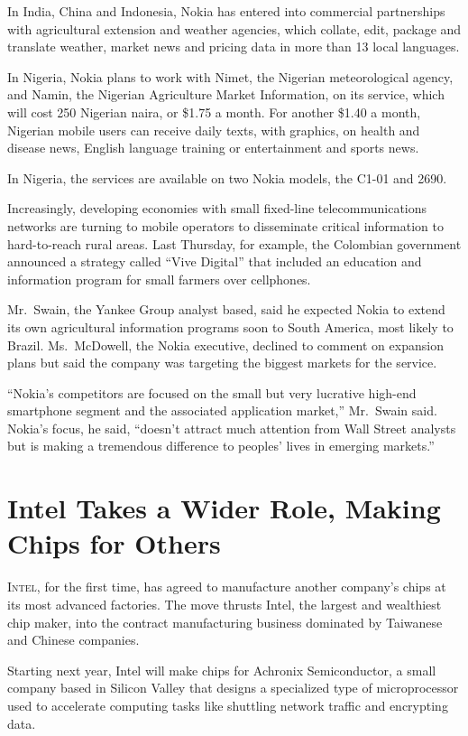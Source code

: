 ﻿\documentclass[12pt]{article}
\begin{document}
In India, China and Indonesia, Nokia has entered into commercial partnerships with agricultural
extension and weather agencies, which collate, edit, package and translate weather, market news and
pricing data in more than 13 local languages.

In Nigeria, Nokia plans to work with Nimet, the Nigerian meteorological agency, and Namin, the
Nigerian Agriculture Market Information, on its service, which will cost 250 Nigerian naira, or
\$1.75 a month. For another \$1.40 a month, Nigerian mobile users can receive daily texts, with
graphics, on health and disease news, English language training or entertainment and sports news.

In Nigeria, the services are available on two Nokia models, the C1-01 and 2690.

Increasingly, developing economies with small fixed-line telecommunications networks are turning to
mobile operators to disseminate critical information to hard-to-reach rural areas. Last Thursday,
for example, the Colombian government announced a strategy called ``Vive Digital'' that included an
education and information program for small farmers over cellphones.

Mr.~Swain, the Yankee Group analyst based, said he expected Nokia to extend its own agricultural
information programs soon to South America, most likely to Brazil. Ms.~McDowell, the Nokia
executive, declined to comment on expansion plans but said the company was targeting the biggest
markets for the service.

``Nokia's competitors are focused on the small but very lucrative high-end smartphone segment and
the associated application market,'' Mr.~Swain said. Nokia's focus, he said, ``doesn't attract much
attention from Wall Street analysts but is making a tremendous difference to peoples' lives in
emerging markets.''


\section{Intel Takes a Wider Role, Making Chips for Others}

\lettrine{I}{ntel}, for the first time, has agreed to manufacture another
company's chips at its most advanced factories. The move thrusts Intel, the largest and wealthiest
chip maker, into the contract manufacturing business dominated by Taiwanese and Chinese companies.

Starting next year, Intel will make chips for Achronix Semiconductor, a small company based in
Silicon Valley that designs a specialized type of microprocessor used to accelerate computing tasks
like shuttling network traffic and encrypting data.
\end{document}
